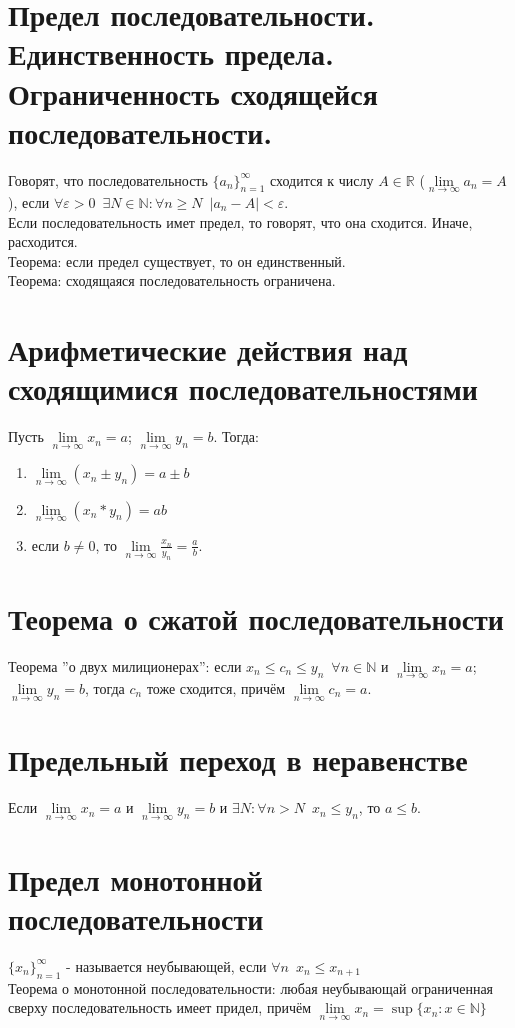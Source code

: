 \documentclass[11pt, a4paper, utf-8]{article}
\def\R{\mathbb{R}}
\def\N{\mathbb{N}}
\def\sp{\, \, \,}
\def\linf{\lim \limits_{n \to \infty}}
\begin{document}
    \section{Предел последовательности. Единственность предела. Ограниченность сходящейся последовательности.}
    Говорят, что последовательность $\{a_n\}_{n=1}^{\infty}$ сходится к числу $A \in \R$ ($\linf a_n = A$), если $\forall \varepsilon > 0 \sp \exists N \in \N: \forall n \geq N \sp |a_n - A| < \varepsilon$.\\
    Если последовательность имет предел, то говорят, что она сходится. Иначе, расходится.\\
    Теорема: если предел существует, то он единственный.\\
    Теорема: сходящаяся последовательность ограничена.\\

    \section{Арифметические действия над сходящимися последовательностями}
    Пусть $\linf x_n = a$; $\linf y_n = b$. Тогда:
    \begin{enumerate}
        \item $\linf (x_n \pm y_n) = a \pm b$
        \item $\linf (x_n * y_n) = ab$
        \item если $b \neq 0$, то $\linf \frac{x_n}{y_n} = \frac{a}{b}$.
    \end{enumerate}

    \section{Теорема о сжатой последовательности}
    Теорема ''о двух милиционерах'': если $x_n \leq c_n \leq y_n \sp \forall n \in \N$ и $\linf x_n = a$; $\linf y_n = b$, тогда $c_n$ тоже сходится, причём $\linf c_n = a$.

    \section{Предельный переход в неравенстве}
    Если $\linf x_n = a$ и $\linf y_n = b$ и $\exists N: \forall n > N \sp x_n \leq y_n$, то $a \leq b$.
    
    \section{Предел монотонной последовательности}
    $\{x_n\}_{n=1}^{\infty}$ - называется неубывающей, если $\forall n \sp x_n \leq x_{n+1}$\\
    Теорема о монотонной последовательности: любая неубывающай ограниченная сверху последовательность имеет придел, причём $\linf x_n = \sup \{x_n: x \in \N\}$
\end{document}
